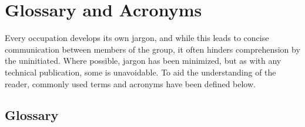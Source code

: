 \chapter{Glossary and Acronyms}
\label{app:glossary}

Every occupation develops its own jargon, and while this leads to concise
communication between members of the group, it often hinders comprehension by
the uninitiated. Where possible, jargon has been minimized, but as with any
technical publication, some is unavoidable. To aid the understanding of the
reader, commonly used terms and acronyms have been defined below.

\section{Glossary}
\label{sec:gloassary}

